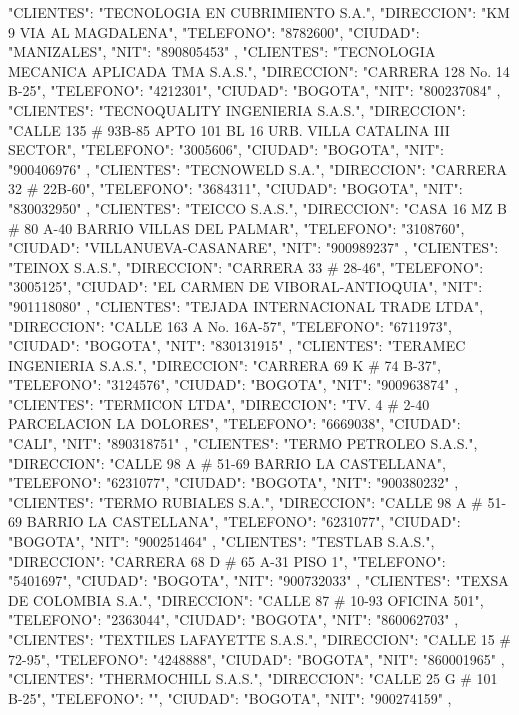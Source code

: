    {
   "CLIENTES": "TECNOLOGIA EN CUBRIMIENTO S.A.",
   "DIRECCION": "KM 9 VIA AL MAGDALENA",
   "TELEFONO": "8782600",
   "CIUDAD": "MANIZALES",
   "NIT": "890805453"
   },
   {
   "CLIENTES": "TECNOLOGIA MECANICA APLICADA TMA S.A.S.",
   "DIRECCION": "CARRERA 128 No. 14 B-25",
   "TELEFONO": "4212301",
   "CIUDAD": "BOGOTA",
   "NIT": "800237084"
   },
   {
   "CLIENTES": "TECNOQUALITY INGENIERIA S.A.S.",
   "DIRECCION": "CALLE 135 # 93B-85 APTO 101 BL 16 URB. VILLA CATALINA III SECTOR",
   "TELEFONO": "3005606",
   "CIUDAD": "BOGOTA",
   "NIT": "900406976"
   },
   {
   "CLIENTES": "TECNOWELD S.A.",
   "DIRECCION": "CARRERA 32 # 22B-60",
   "TELEFONO": "3684311",
   "CIUDAD": "BOGOTA",
   "NIT": "830032950"
   },
   {
   "CLIENTES": "TEICCO S.A.S.",
   "DIRECCION": "CASA 16 MZ B # 80 A-40 BARRIO VILLAS DEL PALMAR",
   "TELEFONO": "3108760",
   "CIUDAD": "VILLANUEVA-CASANARE",
   "NIT": "900989237"
   },
   {
   "CLIENTES": "TEINOX S.A.S.",
   "DIRECCION": "CARRERA 33 # 28-46",
   "TELEFONO": "3005125",
   "CIUDAD": "EL CARMEN DE VIBORAL-ANTIOQUIA",
   "NIT": "901118080"
   },
   {
   "CLIENTES": "TEJADA INTERNACIONAL TRADE LTDA",
   "DIRECCION": "CALLE 163 A No. 16A-57",
   "TELEFONO": "6711973",
   "CIUDAD": "BOGOTA",
   "NIT": "830131915"
   },
   {
   "CLIENTES": "TERAMEC INGENIERIA S.A.S.",
   "DIRECCION": "CARRERA 69 K # 74 B-37",
   "TELEFONO": "3124576",
   "CIUDAD": "BOGOTA",
   "NIT": "900963874"
   },
   {
   "CLIENTES": "TERMICON LTDA",
   "DIRECCION": "TV. 4 # 2-40 PARCELACION LA DOLORES",
   "TELEFONO": "6669038",
   "CIUDAD": "CALI",
   "NIT": "890318751"
   },
   {
   "CLIENTES": "TERMO PETROLEO S.A.S.",
   "DIRECCION": "CALLE 98 A # 51-69 BARRIO LA CASTELLANA",
   "TELEFONO": "6231077",
   "CIUDAD": "BOGOTA",
   "NIT": "900380232"
   },
   {
   "CLIENTES": "TERMO RUBIALES S.A.",
   "DIRECCION": "CALLE 98 A # 51-69 BARRIO LA CASTELLANA",
   "TELEFONO": "6231077",
   "CIUDAD": "BOGOTA",
   "NIT": "900251464"
   },
   {
   "CLIENTES": "TESTLAB S.A.S.",
   "DIRECCION": "CARRERA 68 D # 65 A-31 PISO 1",
   "TELEFONO": "5401697",
   "CIUDAD": "BOGOTA",
   "NIT": "900732033"
   },
   {
   "CLIENTES": "TEXSA DE COLOMBIA S.A.",
   "DIRECCION": "CALLE 87 # 10-93 OFICINA 501",
   "TELEFONO": "2363044",
   "CIUDAD": "BOGOTA",
   "NIT": "860062703"
   },
   {
   "CLIENTES": "TEXTILES LAFAYETTE S.A.S.",
   "DIRECCION": "CALLE 15 # 72-95",
   "TELEFONO": "4248888",
   "CIUDAD": "BOGOTA",
   "NIT": "860001965"
   },
   {
   "CLIENTES": "THERMOCHILL S.A.S.",
   "DIRECCION": "CALLE 25 G # 101 B-25",
   "TELEFONO": "",
   "CIUDAD": "BOGOTA",
   "NIT": "900274159"
   },
